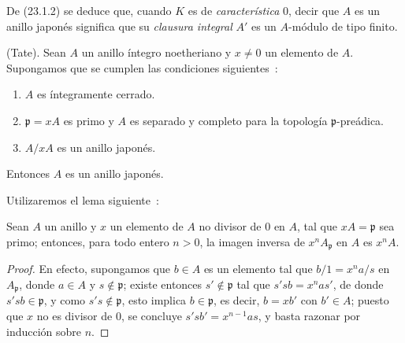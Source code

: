 De (23.1.2) se deduce que, cuando $K$ es de \emph{característica} $0$, decir que
$A$ es un anillo japonés significa que su \emph{clausura integral} $A'$ es
un $A$-módulo de tipo finito.

\begin{theorem}[23.1.3]
\label{0.23.1.3-es}
\textnormal{(Tate).} Sean $A$ un anillo íntegro noetheriano y $x\neq0$ un
elemento de $A$. Supongamos que se cumplen las condiciones siguientes~:
\begin{enumerate}
  \item[\textup{(i)}] $A$ es íntegramente cerrado.
  \item[\textup{(ii)}] $\mathfrak p=xA$ es primo y $A$ es separado y completo para
  la topología $\mathfrak p$-preádica.
  \item[\textup{(iii)}] $A/xA$ es un anillo japonés.
\end{enumerate}
Entonces $A$ es un anillo japonés.
\end{theorem}

Utilizaremos el lema siguiente~:

\begin{lemma}[23.1.3.1]
\label{0.23.1.3.1-es}
Sean $A$ un anillo y $x$ un elemento de $A$ no divisor de $0$ en $A$, tal
que $xA=\mathfrak p$ sea primo; entonces, para todo entero $n>0$, la imagen
inversa de $x^nA_{\mathfrak p}$ en $A$ es $x^nA$.
\end{lemma}

\begin{proof}
En efecto, supongamos que $b\in A$ es un elemento tal que
$b/1=x^na/s$ en $A_{\mathfrak p}$, donde $a\in A$ y
$s\notin\mathfrak p$; existe entonces $s'\notin\mathfrak p$ tal que
$s'sb=x^nas'$, de donde $s'sb\in\mathfrak p$, y como
$s's\notin\mathfrak p$, esto implica $b\in\mathfrak p$, es decir,
$b=xb'$ con $b'\in A$; puesto que $x$ no es divisor de $0$, se concluye
$s'sb'=x^{n-1}as$, y basta razonar por inducción sobre $n$.
\end{proof}

